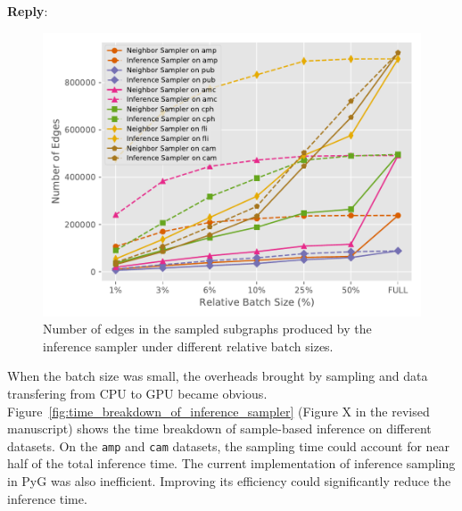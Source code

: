 \documentclass[12pt]{article}
\newenvironment{reply}
   {\medskip \noindent \textbf{Reply}:\  }
   {\medskip}
\begin{document}
\begin{reply}
     \begin{figure}[H]
        \centering
        \includegraphics[width=0.6\columnwidth]{../figs/experiments/exp_inference_graph_info_edges}
        \caption{Number of edges in the sampled subgraphs produced by the inference sampler under different relative batch sizes.}
        \label{fig:sampled_graph_size}
     \end{figure}
     
     When the batch size was small, the overheads brought by sampling and data transfering from CPU to GPU became obvious.
     Figure~\ref{fig:time_breakdown_of_inference_sampler} (Figure X in the revised manuscript) shows the time breakdown of sample-based inference on different datasets.
     On the \texttt{amp} and \texttt{cam} datasets, the sampling time could account for near half of the total inference time.
     The current implementation of inference sampling in PyG was also inefficient.
     Improving its efficiency could significantly reduce the inference time.
     

\end{reply}
\end{document}
